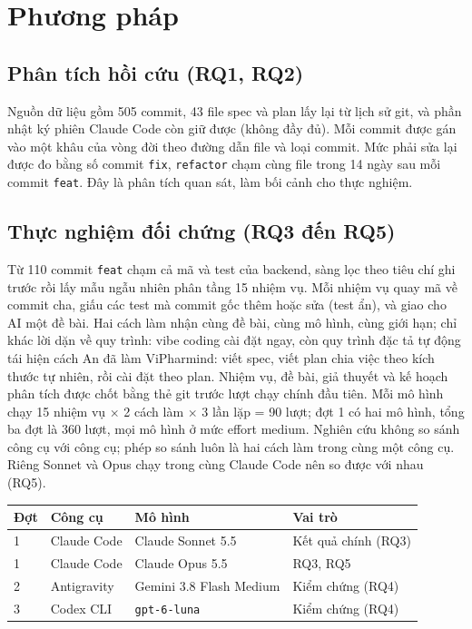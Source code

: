 \documentclass[11pt,a4paper]{article}
\begin{document}
\section{Phương pháp}
\subsection{Phân tích hồi cứu (RQ1, RQ2)}
Nguồn dữ liệu gồm 505 commit, 43 file spec và plan lấy lại từ lịch sử git, và phần nhật ký phiên
Claude Code còn giữ được (không đầy đủ). Mỗi commit được gán vào một khâu của vòng đời theo đường dẫn
file và loại commit. Mức phải sửa lại được đo bằng số commit \texttt{fix}, \texttt{refactor} chạm cùng
file trong 14 ngày sau mỗi commit \texttt{feat}. Đây là phân tích quan sát, làm bối cảnh cho thực nghiệm.

\subsection{Thực nghiệm đối chứng (RQ3 đến RQ5)}
Từ 110 commit \texttt{feat} chạm cả mã và test của backend, sàng lọc theo tiêu chí ghi trước rồi lấy
mẫu ngẫu nhiên phân tầng 15 nhiệm vụ. Mỗi nhiệm vụ quay mã về commit cha, giấu các test mà commit gốc
thêm hoặc sửa (test ẩn), và giao cho AI một đề bài. Hai cách làm nhận cùng đề bài, cùng mô hình, cùng giới
hạn; chỉ khác lời dặn về quy trình: vibe coding cài đặt ngay, còn quy trình đặc tả tự động tái hiện cách
An đã làm ViPharmind: viết spec, viết plan chia việc theo kích thước tự nhiên, rồi cài đặt theo plan. Nhiệm vụ, đề bài, giả thuyết và kế hoạch phân
tích được chốt bằng thẻ git trước lượt chạy chính đầu tiên. Mỗi mô hình chạy 15 nhiệm vụ $\times$ 2 cách
làm $\times$ 3 lần lặp = 90 lượt; đợt 1 có hai mô hình, tổng ba đợt là 360 lượt, mọi mô hình ở mức
effort medium. Nghiên cứu không so sánh công cụ với công cụ; phép so sánh luôn là hai cách làm trong
cùng một công cụ. Riêng Sonnet và Opus chạy trong cùng Claude Code nên so được với nhau (RQ5).

\begin{center}\small
\begin{tabular}{@{}llll@{}}
\toprule
Đợt & Công cụ & Mô hình & Vai trò \\
\midrule
1 & Claude Code & Claude Sonnet 5.5 & Kết quả chính (RQ3) \\
1 & Claude Code & Claude Opus 5.5 & RQ3, RQ5 \\
2 & Antigravity & Gemini 3.8 Flash Medium & Kiểm chứng (RQ4) \\
3 & Codex CLI & \texttt{gpt-6-luna} & Kiểm chứng (RQ4) \\
\bottomrule
\end{tabular}
\end{center}
\end{document}

